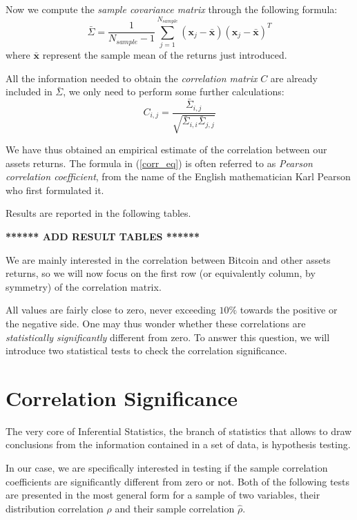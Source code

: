 Now we compute the \textit{sample covariance matrix} through the following formula:
\begin{equation*}
\bar{\Sigma}  = \frac{1}{N_{sample}-1} \sum_{j=1}^{N_{sample}} (\mathbf{x}_j - \mathbf{\bar{x}}) (\mathbf{x}_j - \mathbf{\bar{x}})^T
\end{equation*}
where $\mathbf{\bar{x}}$ represent the sample mean of the returns just introduced.
	
All the information needed to obtain the \textit{correlation matrix} $C$ are already included in $\bar{\Sigma}$, we only need to perform some further calculations:
\begin{equation}
\label{corr_eq}
	C_{i,j} = \frac{\bar{\Sigma}_{i,j}}{\sqrt{\bar{\Sigma}_{i,i} \bar{\Sigma}_{j,j}}}
\end{equation}

We have thus obtained an empirical estimate of the correlation between our assets returns. The formula in (\ref{corr_eq}) is often referred to as \textit{Pearson correlation coefficient}, from the name of the English mathematician Karl Pearson who first formulated it.

Results are reported in the following tables.

\begin{center}
	\textbf{****** ADD RESULT TABLES ******}
\end{center}

We are mainly interested in the correlation between Bitcoin and other assets returns, so we will now focus on the first row (or equivalently column, by symmetry) of the correlation matrix.

All values are fairly close to zero, never exceeding $10\%$ towards the positive or the negative side. 
One may thus wonder whether these correlations are \textit{statistically significantly} different from zero.
To answer this question, we will introduce two statistical tests to check the correlation significance.


\bigskip
\section{Correlation Significance}
The very core of Inferential Statistics, the branch of statistics that allows to draw conclusions from the information contained in a set of data, is hypothesis testing. 

In our case, we are specifically interested in testing if the sample correlation coefficients are significantly different from zero or not.
Both of the following tests are presented in the most general form for a sample of two variables, their distribution correlation $\rho$ and their sample correlation $\hat{\rho}$. 

